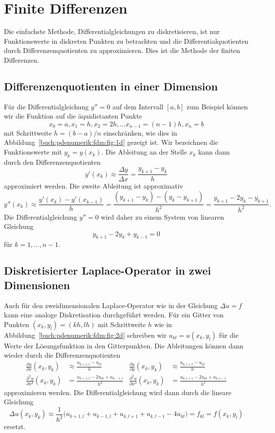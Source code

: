 %
%
\section{Finite Differenzen
\label{buch:pdenumerik:section:fdm}}
%
Die einfachste Methode, Differentialgleichungen zu diskretisieren,
ist nur Funktionswerte in diskreten Punkten zu betrachten und die
Differentialquotienten durch Differenzenquotienten zu approximieren.
Dies ist die Methode der finiten Differenzen.
%
%

%
%
\subsection{Differenzenquotienten in einer Dimension
\label{buch:pdenumerik:fdm:subsection:1d}}
Für die Differentialgleichung $y''=0$ auf dem Intervall $[a,b]$
zum Beispiel können wir die Funktion auf die äquidistanten Punkte
%
\[
x_0=a,
x_1=h,
x_2=2h,
\dots
x_{n-1}=(n-1)h,
x_n=b
\]
mit Schrittweite $h = (b-a)/n$ einschränken, wie dies in
Abbildung~\ref{buch:pdenumerik:fdm:fig:1d} gezeigt ist.
Wir bezeichnen die Funktionswerte mit $y_k = y(x_k)$.
Die Ableitung an der Stelle $x_k$ kann dann durch den Differenzenquotienten
\[
y'(x_k)
\approx
\frac{\Delta y}{\Delta x}
=
\frac{y_{k+1}-y_k}{h}
\]
approximiert werden.
Die zweite Ableitung ist approximativ
\[
y''(x_k)
\approx
\frac{y'(x_k) - y'(x_{k-1})}{h}
=
\frac{(y_{k+1}-y_{k})-(y_k-y_{k+1})}{h^2}
=
\frac{y_{k+1}-2y_{k}-y_{k+1}}{h^2}.
\]
Die Differentialgleichung $y''=0$ wird daher zu einem System von
linearen Gleichung
\[
y_{k+1} - 2y_k + y_{k-1} = 0
\]
für $k=1,\dots,n-1$.

%
%
\subsection{Diskretisierter Laplace-Operator in zwei Dimensionen
\label{buch:pdenumerik:fdm:subsection:laplace}}
Auch für den zweidimensionalen Laplace-Operator wie in der Gleichung
$\Delta u = f$ kann eine analoge Diskretisation durchgeführt
werden.
%
Für ein Gitter von Punkten $(x_k,y_l) = (kh,lh)$ mit Schrittweite $h$
wie in Abbildung~\ref{buch:pdenumerik:fdm:fig:2d}
schreiben wir $u_{kl}=u(x_k,y_l)$ für die Werte der Lösungsfunktion
in den Gitterpunkten.
Die Ableitungen können dann wieder durch die Differenzenquotienten
\begin{align*}
\frac{\partial u}{\partial x}(x_k,y_k)
&\approx
\frac{u_{k+1,l}-u_{kl}}{h}
&
\frac{\partial u}{\partial y}(x_k,y_k)
&\approx
\frac{u_{k,l+1}-u_{kl}}{h}
\\
\frac{\partial^2 u}{\partial x^2}(x_k,y_k)
&=
\frac{u_{k+1,l}-2u_{kl}+u_{k-1,l}}{h^2}
&
\frac{\partial^2 u}{\partial x^2}(x_k,y_k)
&=
\frac{u_{k,l+1}-2u_{kl}+u_{k,l-1}}{h^2}
\end{align*}
approximieren werden.
Die Differentialgleichung wird dann durch die lineare Gleichung
\[
\Delta u(x_k,y_k)
\approx
\frac{1}{h^2}
\bigl(
u_{k+1,l}+u_{k-1,l}+u_{k,l+1}+u_{k,l-1} - 4 u_{kl}
\bigr)
=
f_{kl} = f(x_k,y_l)
\]
ersetzt.

